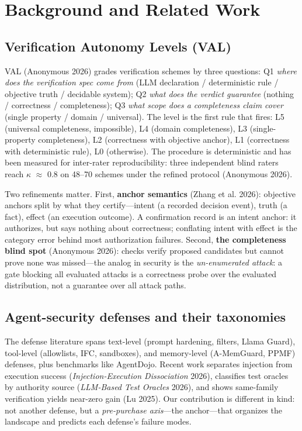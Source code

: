 \documentclass[11pt]{article}
\begin{document}
\section{Background and Related Work}\label{background-and-related-work}

\subsection{Verification Autonomy Levels (VAL)}\label{verification-autonomy-levels-val}

VAL (Anonymous 2026) grades verification schemes by three questions: Q1 \emph{where does the verification spec come from} (LLM declaration / deterministic rule / objective truth / decidable system); Q2 \emph{what does the verdict guarantee} (nothing / correctness / completeness); Q3 \emph{what scope does a completeness claim cover} (single property / domain / universal). The level is the first rule that fires: L5 (universal completeness, impossible), L4 (domain completeness), L3 (single-property completeness), L2 (correctness with objective anchor), L1 (correctness with deterministic rule), L0 (otherwise). The procedure is deterministic and has been measured for inter-rater reproducibility: three independent blind raters reach $\kappa$ $\approx$ 0.8 on 48--70 schemes under the refined protocol (Anonymous 2026).

Two refinements matter. First, \textbf{anchor semantics} (Zhang et al. 2026): objective anchors split by what they certify---intent (a recorded decision event), truth (a fact), effect (an execution outcome). A confirmation record is an intent anchor: it authorizes, but says nothing about correctness; conflating intent with effect is the category error behind most authorization failures. Second, \textbf{the completeness blind spot} (Anonymous 2026): checks verify proposed candidates but cannot prove none was missed---the analog in security is the \emph{un-enumerated attack}: a gate blocking all evaluated attacks is a correctness probe over the evaluated distribution, not a guarantee over all attack paths.

\subsection{Agent-security defenses and their taxonomies}\label{agent-security-defenses-and-their-taxonomies}

The defense literature spans text-level (prompt hardening, filters, Llama Guard), tool-level (allowlists, IFC, sandboxes), and memory-level (A-MemGuard, PPMF) defenses, plus benchmarks like AgentDojo. Recent work separates injection from execution success (\emph{Injection-Execution Dissociation} 2026), classifies test oracles by authority source (\emph{LLM-Based Test Oracles} 2026), and shows same-family verification yields near-zero gain ({Lu} 2025). Our contribution is different in kind: not another defense, but a \emph{pre-purchase axis}---the anchor---that organizes the landscape and predicts each defense's failure modes.
\end{document}
